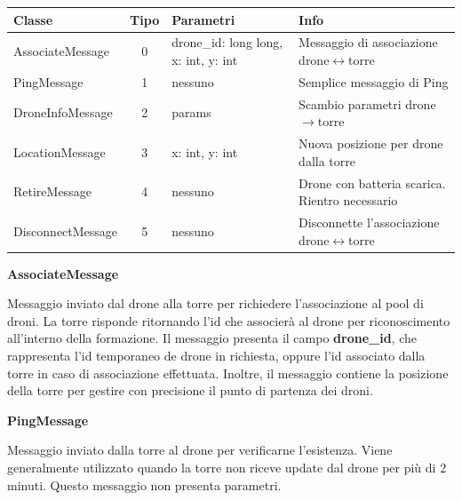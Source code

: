 \documentclass[a4paper, 11pt]{article}
\newenvironment{myindentpar}[1]%
  {\begin{list}{}%
          {\setlength{\leftmargin}{#1}}%
          \item[]%
  }
  {\end{list}}
\begin{document}
\small

\begin{adjustbox}{max width=\textwidth}
    \begin{tabularx}{\textwidth}{|L|c|L|L|}
    \hline
    \rule{0pt}{3ex} %
    \textbf{Classe} & \textbf{Tipo} & \textbf{Parametri} & \textbf{Info} \\
    \hline
    \rule{0pt}{3ex} %
    AssociateMessage & 0 & drone\_id: long long, x: int, y: int & Messaggio di associazione drone$\leftrightarrow$torre \\
    \hline
    \rule{0pt}{3ex} %
    PingMessage & 1 & nessuno & Semplice messaggio di Ping \\
    \hline
    \rule{0pt}{3ex} %
    DroneInfoMessage & 2 & {params} & Scambio parametri drone$\rightarrow$torre \\
    \hline
    \rule{0pt}{3ex} %
    LocationMessage & 3 & x: int, y: int & Nuova posizione per drone dalla torre \\
    \hline
    \rule{0pt}{3ex} %
    RetireMessage & 4 & nessuno & Drone con batteria scarica. Rientro necessario \\
    \hline
    \rule{0pt}{3ex} %
    DisconnectMessage & 5 & nessuno & Disconnette l'associazione drone$\leftrightarrow$torre \\
    \hline
    \end{tabularx}
\end{adjustbox}

\textbf{AssociateMessage}

\begin{myindentpar}{0.4cm}
Messaggio inviato dal drone alla torre per richiedere l'associazione al pool di droni.
La torre risponde ritornando l'id che associerà al drone per riconoscimento all'interno della formazione.
Il messaggio presenta il campo \textbf{drone\_id}, che rappresenta l'id temporaneo de drone in richiesta, oppure l'id associato dalla torre in caso di associazione effettuata.
Inoltre, il messaggio contiene la posizione della torre per gestire con precisione il punto di partenza dei droni.
\end{myindentpar}

\textbf{PingMessage}
\begin{myindentpar}{0.4cm}
Messaggio inviato dalla torre al drone per verificarne l'esistenza. Viene generalmente utilizzato quando la torre non riceve update dal drone per più di 2 minuti.
Questo messaggio non presenta parametri.
\end{myindentpar}
\end{document}
